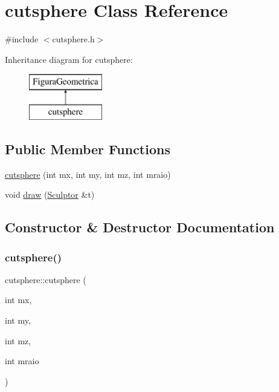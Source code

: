 \hypertarget{classcutsphere}{}\section{cutsphere Class Reference}
\label{classcutsphere}


{\ttfamily \#include $<$cutsphere.\+h$>$}

Inheritance diagram for cutsphere\+:\begin{figure}[H]
\begin{center}
\leavevmode
\includegraphics[height=2.000000cm]{classcutsphere}
\end{center}
\end{figure}
\subsection*{Public Member Functions}
\begin{DoxyCompactItemize}
\item 
\mbox{\hyperlink{classcutsphere_aea328d97e8c7570b7764ed9b3a2b0328}{cutsphere}} (int mx, int my, int mz, int mraio)
\item 
void \mbox{\hyperlink{classcutsphere_a7dbeb4df030b362a0d11a758978dd37d}{draw}} (\mbox{\hyperlink{class_sculptor}{Sculptor}} \&t)
\end{DoxyCompactItemize}


\subsection{Constructor \& Destructor Documentation}
\mbox{\label{classcutsphere_aea328d97e8c7570b7764ed9b3a2b0328}} 
\subsubsection{\texorpdfstring{cutsphere()}{cutsphere()}}
{\footnotesize\ttfamily cutsphere\+::cutsphere (\begin{DoxyParamCaption}\item[{int}]{mx,  }\item[{int}]{my,  }\item[{int}]{mz,  }\item[{int}]{mraio }\end{DoxyParamCaption})}



